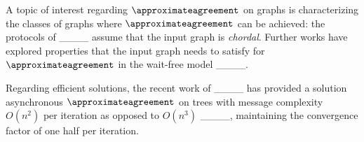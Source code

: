 A topic of interest regarding $\approximateagreement$ on graphs is characterizing the classes of graphs where $\approximateagreement$ can be achieved: the protocols of ____ assume that the input graph is \emph{chordal}. Further works have explored properties that the input graph needs to satisfy for $\approximateagreement$ in the wait-free model ____.

Regarding efficient solutions, the recent work of ____ has provided a solution asynchronous $\approximateagreement$ on trees with message complexity $O(n^2)$ per iteration as opposed to $O(n^3)$ ____, maintaining the convergence factor of one half per iteration.
